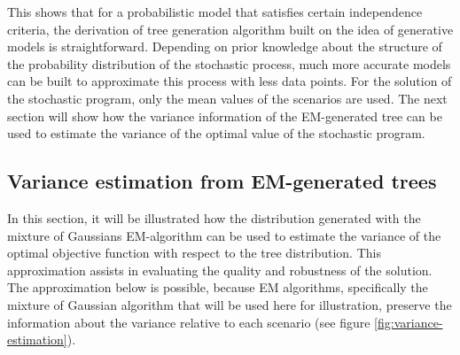 This shows that for a probabilistic model that satisfies certain independence criteria, the derivation of tree generation algorithm built on the idea of generative models is straightforward.
Depending on prior knowledge about the structure of the probability distribution of the stochastic process, much more accurate models can be built to approximate this process with less data points.
For the solution of the stochastic program, only the mean values of the scenarios are used.
The next section will show how the variance information of the EM-generated tree can be used to estimate the variance of the optimal value of the stochastic program.
\subsection{Variance estimation from EM-generated trees}
\label{sec:variance-estimation}
In this section, it will be illustrated how the distribution generated with the mixture of Gaussians EM-algorithm can be used to estimate the variance of the optimal objective function with respect to the tree distribution.
This approximation assists in evaluating the quality and robustness of the solution.
The approximation below is possible, because EM algorithms, specifically the mixture of Gaussian algorithm that will be used here for illustration, preserve the information about the variance relative to each scenario (see figure \ref{fig:variance-estimation}).

